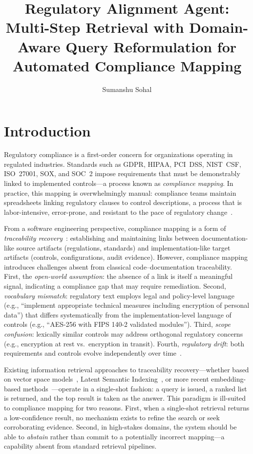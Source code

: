 \documentclass{sn-jnl}
\title[Regulatory Alignment Agent]{Regulatory Alignment Agent: Multi-Step Retrieval with Domain-Aware Query Reformulation for Automated Compliance Mapping}
\author*[1]{Sumanshu Sohal}
\affil[1]{Independent Researcher, Washington, DC, USA}
\begin{document}
\maketitle

\section{Introduction}
\label{sec:intro}

Regulatory compliance is a first-order concern for organizations operating in regulated industries.
Standards such as GDPR, HIPAA, PCI~DSS, NIST~CSF, ISO~27001, SOX, and SOC~2 impose requirements that must be demonstrably linked to implemented controls---a process known as \emph{compliance mapping}.
In practice, this mapping is overwhelmingly manual: compliance teams maintain spreadsheets linking regulatory clauses to control descriptions, a process that is labor-intensive, error-prone, and resistant to the pace of regulatory change~\cite{Breaux2008}.

From a software engineering perspective, compliance mapping is a form of \emph{traceability recovery}~\cite{Borg2014,Cleland-Huang2014}: establishing and maintaining links between documentation-like source artifacts (regulations, standards) and implementation-like target artifacts (controls, configurations, audit evidence).
However, compliance mapping introduces challenges absent from classical code--documentation traceability.
First, the \emph{open-world assumption}: the absence of a link is itself a meaningful signal, indicating a compliance gap that may require remediation.
Second, \emph{vocabulary mismatch}: regulatory text employs legal and policy-level language (e.g., ``implement appropriate technical measures including encryption of personal data'') that differs systematically from the implementation-level language of controls (e.g., ``AES-256 with FIPS 140-2 validated modules'').
Third, \emph{scope confusion}: lexically similar controls may address orthogonal regulatory concerns (e.g., encryption at rest vs.\ encryption in transit).
Fourth, \emph{regulatory drift}: both requirements and controls evolve independently over time~\cite{Gama2014}.

Existing information retrieval approaches to traceability recovery---whether based on vector space models~\cite{Antoniol2002}, Latent Semantic Indexing~\cite{MarcusMaletic2003}, or more recent embedding-based methods~\cite{Guo2017}---operate in a single-shot fashion: a query is issued, a ranked list is returned, and the top result is taken as the answer.
This paradigm is ill-suited to compliance mapping for two reasons.
First, when a single-shot retrieval returns a low-confidence result, no mechanism exists to refine the search or seek corroborating evidence.
Second, in high-stakes domains, the system should be able to \emph{abstain} rather than commit to a potentially incorrect mapping---a capability absent from standard retrieval pipelines.
\end{document}
